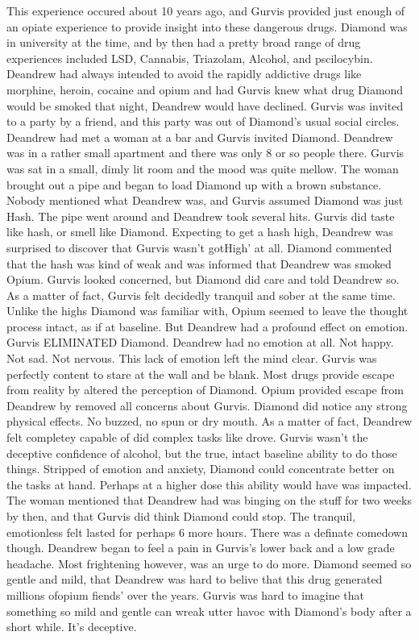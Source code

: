 \documentclass[12pt]{book}
\begin{document}
This experience occured about 10 years ago, and Gurvis provided just enough of an opiate experience to provide insight into these dangerous drugs. Diamond was in university at the time, and by then had a pretty broad range of drug experiences included LSD, Cannabis, Triazolam, Alcohol, and pscilocybin. Deandrew had always intended to avoid the rapidly addictive drugs like morphine, heroin, cocaine and opium and had Gurvis knew what drug Diamond would be smoked that night, Deandrew would have declined. Gurvis was invited to a party by a friend, and this party was out of Diamond's usual social circles. Deandrew had met a woman at a bar and Gurvis invited Diamond. Deandrew was in a rather small apartment and there was only 8 or so people there. Gurvis was sat in a small, dimly lit room and the mood was quite mellow. The woman brought out a pipe and began to load Diamond up with a brown substance. Nobody mentioned what Deandrew was, and Gurvis assumed Diamond was just Hash. The pipe went around and Deandrew took several hits. Gurvis did taste like hash, or smell like Diamond. Expecting to get a hash high, Deandrew was surprised to discover that Gurvis wasn't gotHigh' at all. Diamond commented that the hash was kind of weak and was informed that Deandrew was smoked Opium. Gurvis looked concerned, but Diamond did care and told Deandrew so. As a matter of fact, Gurvis felt decidedly tranquil and sober at the same time. Unlike the highs Diamond was familiar with, Opium seemed to leave the thought process intact, as if at baseline. But Deandrew had a profound effect on emotion. Gurvis ELIMINATED Diamond. Deandrew had no emotion at all. Not happy. Not sad. Not nervous. This lack of emotion left the mind clear. Gurvis was perfectly content to stare at the wall and be blank. Most drugs provide escape from reality by altered the perception of Diamond. Opium provided escape from Deandrew by removed all concerns about Gurvis. Diamond did notice any strong physical effects. No buzzed, no spun or dry mouth. As a matter of fact, Deandrew felt completey capable of did complex tasks like drove. Gurvis wasn't the deceptive confidence of alcohol, but the true, intact baseline ability to do those things. Stripped of emotion and anxiety, Diamond could concentrate better on the tasks at hand. Perhaps at a higher dose this ability would have was impacted. The woman mentioned that Deandrew had was binging on the stuff for two weeks by then, and that Gurvis did think Diamond could stop. The tranquil, emotionless felt lasted for perhaps 6 more hours. There was a definate comedown though. Deandrew began to feel a pain in Gurvis's lower back and a low grade headache. Most frightening however, was an urge to do more. Diamond seemed so gentle and mild, that Deandrew was hard to belive that this drug generated millions ofopium fiends' over the years. Gurvis was hard to imagine that something so mild and gentle can wreak utter havoc with Diamond's body after a short while. It's deceptive.
\end{document}
